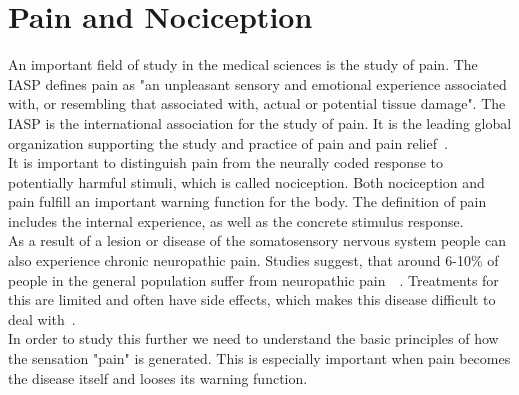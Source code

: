 \section{Pain and Nociception}
An important field of study in the medical sciences is the study of pain. The IASP defines pain as "an unpleasant sensory and emotional experience associated with, or resembling that associated with, actual or potential tissue damage". The IASP is the international association for the study of pain. It is the leading global organization supporting the study and practice of pain and pain relief~\cite{iasp_2022}. \\
It is important to distinguish pain from the neurally coded response to potentially harmful stimuli, which is called nociception. Both nociception and pain fulfill an important warning function for the body. The definition of pain includes the internal experience, as well as the concrete stimulus response.\\
As a result of a lesion or disease of the somatosensory nervous system people can also experience chronic neuropathic pain. Studies suggest, that around 6-10\% of people in the general population suffer from neuropathic pain~\cite{bouhassira_prevalence_2008}~\cite{van_hecke_neuropathic_2014}. Treatments for this are limited and often have side effects, which makes this disease difficult to deal with~\cite{brooks2017treatments}.\\
In order to study this further we need to understand the basic principles of how the sensation "pain" is generated. This is especially important when pain becomes the disease itself and looses its warning function.

